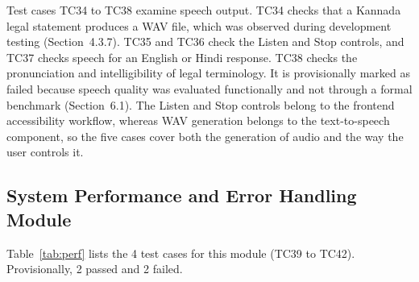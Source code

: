 \documentclass[12pt,a4paper,oneside]{report}
\begin{document}
Test cases TC34 to TC38 examine speech output. TC34 checks that a Kannada legal statement produces a WAV file, which was observed during development testing (Section~4.3.7). TC35 and TC36 check the Listen and Stop controls, and TC37 checks speech for an English or Hindi response. TC38 checks the pronunciation and intelligibility of legal terminology. It is provisionally marked as failed because speech quality was evaluated functionally and not through a formal benchmark (Section~6.1). The Listen and Stop controls belong to the frontend accessibility workflow, whereas WAV generation belongs to the text-to-speech component, so the five cases cover both the generation of audio and the way the user controls it.
\subsection{System Performance and Error Handling Module}
Table~\ref{tab:perf} lists the 4 test cases for this module (TC39 to TC42). Provisionally, 2 passed and 2 failed.
\end{document}
